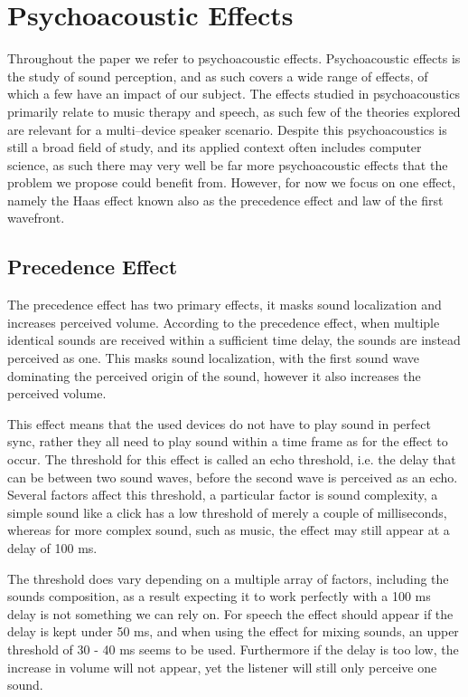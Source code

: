 \section{Psychoacoustic Effects}
Throughout the paper we refer to psychoacoustic effects.
Psychoacoustic effects is the study of sound perception, and as such covers a wide range of effects, of which a few have an impact of our subject.
The effects studied in psychoacoustics primarily relate to music therapy and speech, as such few of the theories explored are relevant for a multi--device speaker scenario. 
Despite this psychoacoustics is still a broad field of study, and its applied context often includes computer science, as such there may very well be far more psychoacoustic effects that the problem we propose could benefit from. 
However, for now we focus on one effect, namely the Haas effect known also as the precedence effect and law of the first wavefront.

\subsection{Precedence Effect}
The precedence effect has two primary effects, it masks sound localization and increases perceived volume.
According to the precedence effect, when multiple identical sounds are received within a sufficient time delay, the sounds are instead perceived as one.
This masks sound localization, with the first sound wave dominating the perceived origin of the sound, however it also increases the perceived volume.

This effect means that the used devices do not have to play sound in perfect sync, rather they all need to play sound within a time frame as for the effect to occur.
The threshold for this effect is called an echo threshold, i.e. the delay that can be between two sound waves, before the second wave is perceived as an echo.
Several factors affect this threshold, a particular factor is sound complexity, a simple sound like a click has a low threshold of merely a couple of milliseconds, whereas for more complex sound, such as music, the effect may still appear at a delay of 100 ms.\cite{precedence_wiki}

The threshold does vary depending on a multiple array of factors, including the sounds composition, as a result expecting it to work perfectly with a 100 ms delay is not something we can rely on.
For speech the effect should appear if the delay is kept under 50 ms, and when using the effect for mixing sounds, an upper threshold of 30 - 40 ms seems to be used.
Furthermore if the delay is too low, the increase in volume will not appear, yet the listener will still only perceive one sound.\cite{useprecedence1}\cite{useprecedence2}\cite{useprecedence3}

